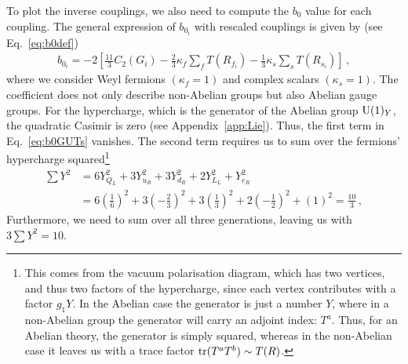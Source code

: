 To plot the inverse couplings, we also need to compute the $b_{0}$ value for each coupling. The general expression of $b_{0_i}$ with rescaled couplings is given by (see Eq.~\eqref{eq:b0def})
\begin{align}
    b_{0_i}= -2\left[\frac{11}{3}C_2(G_i)-\frac{2}{3}\kappa_f\sum_f T(R_{f_i})-\frac{1}{3}\kappa_s\sum_s T(R_{s_i})\right]\,,\label{eq:b0GUTs}
\end{align}
where we consider Weyl fermions $(\kappa_f=1)$ and complex scalars $(\kappa_s=1)$. The coefficient does not only describe non-Abelian groups but also Abelian gauge groups. For the hypercharge, which is the generator of the Abelian group $\mathrm{U}(1)_Y$, the quadratic Casimir is zero (see Appendix~\ref{app:Lie}). Thus, the first term in Eq.~\eqref{eq:b0GUTs} vanishes. The second term requires us to sum over the fermions' hypercharge squared\footnote{This comes from the vacuum polarisation diagram, which has two vertices, and thus two factors of the hypercharge, since each vertex contributes with a factor $g_1Y$. In the Abelian case the generator is just a number $Y$, where in a non-Abelian group the generator will carry an adjoint index: $T^a$. Thus, for an Abelian theory, the generator is simply squared, whereas in the non-Abelian case it leaves us with a trace factor $\operatorname{tr}(T^aT^b)\sim T(R)$. }
\begin{align}
    \sum Y^2&=6Y_{Q_L}^2+3Y_{u_R}^2+3Y_{d_R}^2+2Y_{L_L}^2+Y_{e_R}^2\nonumber\\&=6\left(\frac16\right)^2+3\left(-\frac23\right)^2+3\left(\frac13\right)^2+2\left(-\frac12\right)^2+(1)^2=\frac{10}{3}\,,
\end{align}
Furthermore, we need to sum over all three generations, leaving us with $3\sum Y^2=10$. 

